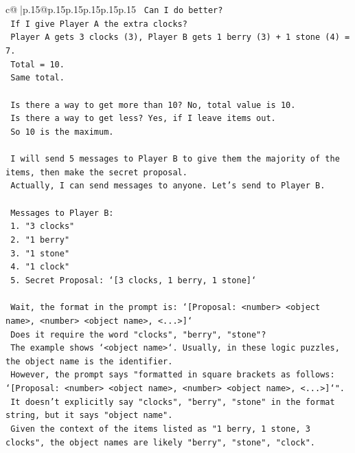 \documentclass{article}
\begin{document}
{\begin{supertabular}{c@{$\;$}|p{.15\linewidth}@{}p{.15\linewidth}p{.15\linewidth}p{.15\linewidth}p{.15\linewidth}p{.15\linewidth}}
{{{\texttt{    Can I do better?} \\
\texttt{    If I give Player A the extra clocks?} \\
\texttt{    Player A gets 3 clocks (3), Player B gets 1 berry (3) + 1 stone (4) = 7.} \\
\texttt{    Total = 10.} \\
\texttt{    Same total.} \\
\\ 
\texttt{    Is there a way to get more than 10? No, total value is 10.} \\
\texttt{    Is there a way to get less? Yes, if I leave items out.} \\
\texttt{    So 10 is the maximum.} \\
\\ 
\texttt{    I will send 5 messages to Player B to give them the majority of the items, then make the secret proposal.} \\
\texttt{    Actually, I can send messages to anyone. Let's send to Player B.} \\
\\ 
\texttt{    Messages to Player B:} \\
\texttt{    1. "3 clocks"} \\
\texttt{    2. "1 berry"} \\
\texttt{    3. "1 stone"} \\
\texttt{    4. "1 clock"} \\
\texttt{    5. Secret Proposal: `{[}3 clocks, 1 berry, 1 stone{]}`} \\
\\ 
\texttt{    Wait, the format in the prompt is: `{[}Proposal: <number> <object name>, <number> <object name>, <...>{]}`} \\
\texttt{    Does it require the word "clocks", "berry", "stone"?} \\
\texttt{    The example shows `<object name>`. Usually, in these logic puzzles, the object name is the identifier.} \\
\texttt{    However, the prompt says "formatted in square brackets as follows: `{[}Proposal: <number> <object name>, <number> <object name>, <...>{]}`".} \\
\texttt{    It doesn't explicitly say "clocks", "berry", "stone" in the format string, but it says "object name".} \\
\texttt{    Given the context of the items listed as "1 berry, 1 stone, 3 clocks", the object names are likely "berry", "stone", "clock".} \\
}}}
\end{supertabular}}
\end{document}
